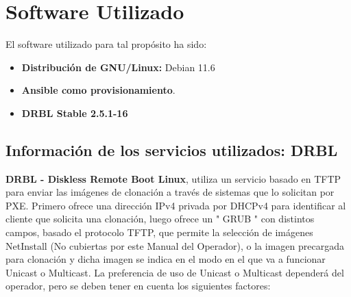 \section{Software Utilizado}

El software utilizado para tal propósito ha sido:

\begin{itemize}
	\item \textbf{Distribución de GNU/Linux:} Debian 11.6
	\item \textbf{Ansible como provisionamiento}.
	\item \textbf{DRBL Stable 2.5.1-16}
\end{itemize}

\subsection{Información de los servicios utilizados: DRBL}

\textbf{DRBL - Diskless Remote Boot Linux}, utiliza un servicio basado en TFTP para enviar las imágenes de clonación a través de sistemas que lo solicitan por PXE. 
Primero ofrece una dirección IPv4 privada por DHCPv4 para identificar al cliente que solicita una clonación, luego ofrece un " GRUB " con distintos campos,
basado el protocolo TFTP, que permite la selección de imágenes NetInstall (No cubiertas por este Manual del Operador), o la imagen precargada para clonación y dicha imagen
se indica en el modo en el que va a funcionar Unicast o Multicast.
\vspace{5mm}
La preferencia de uso de Unicast o Multicast dependerá del operador, pero se deben tener en cuenta los siguientes factores:

